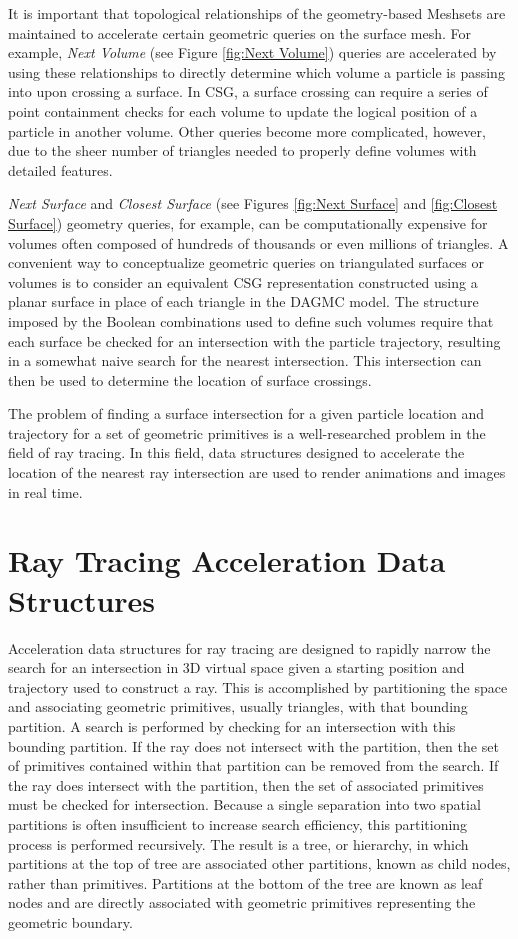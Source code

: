 It is important that topological relationships of the geometry-based Meshsets
are maintained to accelerate certain geometric queries on the surface mesh. For
example, \textit{Next Volume} (see Figure \ref{fig:Next Volume}) queries are
accelerated by using these relationships to directly determine which volume a
particle is passing into upon crossing a surface. In CSG, a surface crossing can
require a series of point containment checks for each volume to update the
logical position of a particle in another volume. Other queries become more
complicated, however, due to the sheer number of triangles needed to properly
define volumes with detailed features.

\textit{Next Surface} and \textit{Closest Surface} (see Figures \ref{fig:Next
  Surface} and \ref{fig:Closest Surface}) geometry queries, for example, can be
computationally expensive for volumes often composed of hundreds of thousands or
even millions of triangles. A convenient way to conceptualize geometric queries
on triangulated surfaces or volumes is to consider an equivalent CSG
representation constructed using a planar surface in place of each triangle in
the DAGMC model. The structure imposed by the Boolean combinations used to
define such volumes require that each surface be checked for an intersection
with the particle trajectory, resulting in a somewhat naive search for the
nearest intersection. This intersection can then be used to
determine the location of surface crossings.

The problem of finding a surface intersection for a given particle location and
trajectory for a set of geometric primitives is a well-researched problem in
the field of ray tracing. In this field, data structures designed to accelerate
the location of the nearest ray intersection are used to render animations and
images in real time.

\section{Ray Tracing Acceleration Data Structures}

Acceleration data structures for ray tracing are designed to rapidly narrow the
search for an intersection in 3D virtual space given a starting position and
trajectory used to construct a ray. This is accomplished by partitioning the
space and associating geometric primitives, usually triangles, with that
bounding partition. A search is performed by checking for an intersection with
this bounding partition. If the ray does not intersect with the partition, then
the set of primitives contained within that partition can be removed from the
search. If the ray does intersect with the partition, then the set of associated
primitives must be checked for intersection. Because a single separation into
two spatial partitions is often insufficient to increase search efficiency, this
partitioning process is performed recursively. The result is a tree, or
hierarchy, in which partitions at the top of tree are associated other
partitions, known as child nodes, rather than primitives. Partitions at the
bottom of the tree are known as leaf nodes and are directly associated with
geometric primitives representing the geometric boundary.

